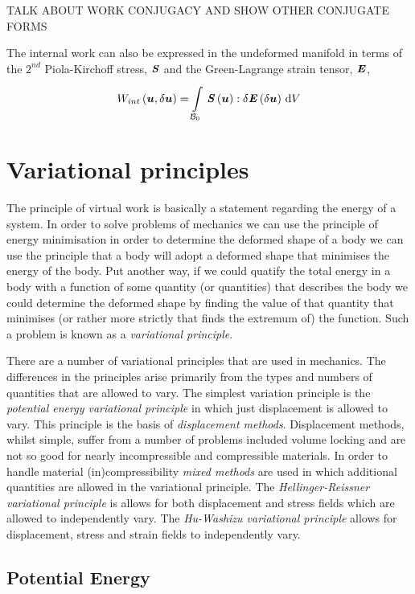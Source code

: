TALK ABOUT WORK CONJUGACY AND SHOW OTHER CONJUGATE FORMS

The internal work can also be expressed in the undeformed manifold in terms of
the $2^{nd}$ Piola-Kirchoff stress, $\boldsymbol{\mathit{S}}$ and the Green-Lagrange strain
tensor, $\boldsymbol{\mathit{E}}$, \ie
\begin{equation}
  \fnof{W_{int}}{\vectr{u},\delta\vectr{u}}=\gint{\embedmanifold{B}_{0}}{}{\doubledotprod{
      \fnof{\tensor{S}}{\vectr{u}}}{\fnof{\delta\tensor{E}}{\delta\vectr{u}}}}{V}
\end{equation}

\section{Variational principles}

The principle of virtual work is basically a statement regarding the energy of
a system. In order to solve problems of mechanics we can use the principle of
energy minimisation in order to determine the deformed shape of a body \ie we
can use the principle that a body will adopt a deformed shape that minimises
the energy of the body. Put another way, if we could quatify the total energy
in a body with a function of some quantity (or quantities) that describes the
body we could determine the deformed shape by finding the value of that
quantity that minimises (or rather more strictly that finds the extremum of)
the function. Such a problem is known as a \emph{variational principle}.

There are a number of variational principles that are used in mechanics. The
differences in the principles arise primarily from the types and numbers of
quantities that are allowed to vary. The simplest variation principle is the
\emph{potential energy variational principle} in which just displacement is
allowed to vary. This principle is the basis of \emph{displacement
  methods}. Displacement methods, whilst simple, suffer from a number of
problems included volume locking and are not so good for nearly incompressible
and compressible materials. In order to handle material (in)compressibility
\emph{mixed methods} are used in which additional quantities are allowed in
the variational principle. The \emph{Hellinger-Reissner variational principle}
is allows for both displacement and stress fields which are allowed to
independently vary. The \emph{Hu-Washizu variational principle} allows for
displacement, stress and strain fields to independently vary. 

\subsection{Potential Energy}

